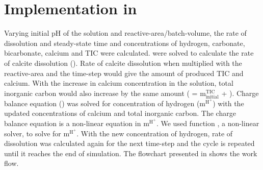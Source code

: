 \section{Implementation in \MATLAB}
Varying initial pH of the solution and reactive-area/batch-volume, the rate of dissolution and steady-state time and 
concentrations of hydrogen, carbonate, bicarbonate, calcium and TIC were calculated.  were solved 
to calculate the rate of calcite dissolution (). Rate of calcite dissolution when multiplied with the reactive-area 
and the time-step would give the amount of produced TIC and calcium. With the increase in calcium concentration in the 
solution, total inorganic carbon would also increase by the same amount ( = $\mathrm{m_{initial}^{TIC}}$ + ). 
Charge balance equation () was solved for concentration of hydrogen ($\mathrm{m^{H^{+}}}$) with the updated concentrations 
of calcium and total inorganic carbon. The charge balance equation is a non-linear equation in $\mathrm{m^{H^+}}$. 
We used \MATLAB function , a non-linear solver, to solve  for $\mathrm{m^{H^+}}$. With the new 
concentration of hydrogen, rate of dissolution was calculated again for the next time-step and the cycle is repeated until it 
reaches the end of simulation. The flowchart presented in  shows the work flow. 

